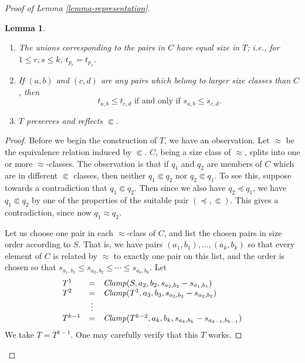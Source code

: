 \documentclass[letterpaper]{article} %
\newtheorem{lemma}[theorem]{Lemma}
\theoremstyle{definition}
\newcommand{\Clamp}{\protect{\mbox{\textit{Clamp}}}}
\newcommand{\precsubseteq}{\Subset}
\newcommand{\approxsubset}{\Subset}
\begin{document}
\begin{proof}[Proof of Lemma \ref{lemma-representation}]
\begin{lemma}
\begin{enumerate}
    \item The unions corresponding to the pairs in $C$ have equal size in $T$; i.e., for $1\leq r,s \leq k$, $t_{p_r} = t_{p_s}$.
    
    \item If $(a,b)$ and $(c,d)$ are any pairs 
    which belong to larger size classes than $C$,
    then 
    \[ \mbox{$t_{a,b} \leq t_{c,d} $ if and only if $s_{a,b} \leq s_{c,d} $}.\]
    
    \item $T$ preserves and reflects $\precsubseteq$. 
\label{equalize2}
\end{enumerate}

\label{lemma-equalizing}
\end{lemma}
\begin{proof}
Before we begin the construction of $T$,
we have an observation.
Let $\approx$ be the equivalence relation induced by $\precsubseteq$.
$C$, being a size class of $\approx$, splits into one or more
$\approx$-classes.
The observation is that if $q_1$ and $q_2$ are members of $C$ which are in different $\approxsubset$
classes, then neither $q_1 \precsubseteq q_2$ nor  $q_2 \precsubseteq q_1$.
To see this, suppose towards a contradiction that  $q_1 \precsubseteq q_2$.
Then since we also have $q_2 \preceq q_1$, we have 
$q_1 \precsubseteq q_2$ by one of the properties of the suitable pair $(\preceq, \precsubseteq)$.
This gives a contradiction, since now $q_1 \approx q_2$.


Let us choose one pair in each $\approx$-class of 
$C$, and list the chosen pairs in size order according to $S$.
That is, we have pairs $(a_1, b_1), \ldots, (a_k,b_k)$
so that every element of $C$ is related by 
$\approx$ to exactly one pair on this list,
and the order is chosen so that
$s_{a_1, b_1} \leq s_{a_2, b_2} \leq \cdots\leq s_{a_k, b_k}$.
 Let 
\[ \begin{array}{lcl}
 T^1  & = &  \Clamp(S,a_2,b_2,s_{a_2, b_2} - s_{a_1, b_1})\\
T^2 & = & \Clamp(T^1,a_3, b_3, s_{a_3, b_3} - s_{a_2, b_2} )\\
  & \vdots   & \\
T^{k-1} & = & \Clamp(T^{k-2},a_k,b_k,
s_{a_k, b_k} - s_{a_{k-1}, b_{k-1}})\\
\end{array}
\]
We take $T = T^{k-1}$.  One may carefully verify that this $T$ works.  
\end{proof}



\end{proof}
\end{document}
